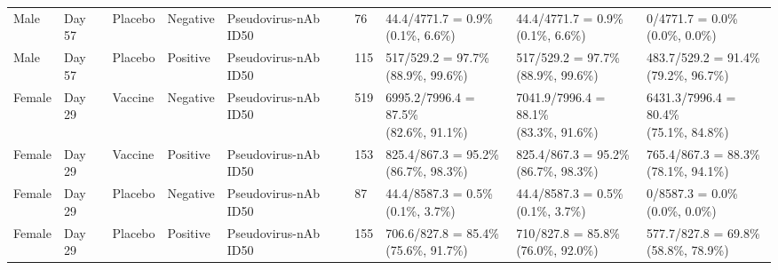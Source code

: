 \documentclass[]{book}
\theoremstyle{definition}
\theoremstyle{definition}
\theoremstyle{definition}
\newcommand{\1}{\mathbbm{1}}
\begin{document}
\begin{landscape}
\begin{ThreePartTable}
\begin{longtable}[t]{>{\raggedright\arraybackslash}p{2.7cm}llllllll}
\hspace{1em}Male & Day 57 & Placebo & Negative & Pseudovirus-nAb ID50 & 76 & \makecell[l]{44.4/4771.7 = 0.9\%\\(0.1\%, 6.6\%)} & \makecell[l]{44.4/4771.7 = 0.9\%\\(0.1\%, 6.6\%)} & \makecell[l]{0/4771.7 = 0.0\%\\(0.0\%, 0.0\%)}\\
\hspace{1em}Male & Day 57 & Placebo & Positive & Pseudovirus-nAb ID50 & 115 & \makecell[l]{517/529.2 = 97.7\%\\(88.9\%, 99.6\%)} & \makecell[l]{517/529.2 = 97.7\%\\(88.9\%, 99.6\%)} & \makecell[l]{483.7/529.2 = 91.4\%\\(79.2\%, 96.7\%)}\\
\hspace{1em}Female & Day 29 & Vaccine & Negative & Pseudovirus-nAb ID50 & 519 & \makecell[l]{6995.2/7996.4 = 87.5\%\\(82.6\%, 91.1\%)} & \makecell[l]{7041.9/7996.4 = 88.1\%\\(83.3\%, 91.6\%)} & \makecell[l]{6431.3/7996.4 = 80.4\%\\(75.1\%, 84.8\%)}\\
\hspace{1em}Female & Day 29 & Vaccine & Positive & Pseudovirus-nAb ID50 & 153 & \makecell[l]{825.4/867.3 = 95.2\%\\(86.7\%, 98.3\%)} & \makecell[l]{825.4/867.3 = 95.2\%\\(86.7\%, 98.3\%)} & \makecell[l]{765.4/867.3 = 88.3\%\\(78.1\%, 94.1\%)}\\
\hspace{1em}Female & Day 29 & Placebo & Negative & Pseudovirus-nAb ID50 & 87 & \makecell[l]{44.4/8587.3 = 0.5\%\\(0.1\%, 3.7\%)} & \makecell[l]{44.4/8587.3 = 0.5\%\\(0.1\%, 3.7\%)} & \makecell[l]{0/8587.3 = 0.0\%\\(0.0\%, 0.0\%)}\\
\hspace{1em}Female & Day 29 & Placebo & Positive & Pseudovirus-nAb ID50 & 155 & \makecell[l]{706.6/827.8 = 85.4\%\\(75.6\%, 91.7\%)} & \makecell[l]{710/827.8 = 85.8\%\\(76.0\%, 92.0\%)} & \makecell[l]{577.7/827.8 = 69.8\%\\(58.8\%, 78.9\%)}\\

\end{longtable}
\end{ThreePartTable}
\end{landscape}
\end{document}
